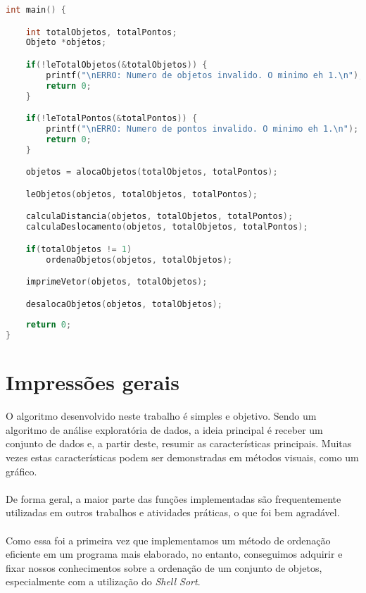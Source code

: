 \documentclass{article}
\begin{document}
\begin{lstlisting}[label={lst:cod1},language=C]
int main() {

    int totalObjetos, totalPontos;
    Objeto *objetos;

    if(!leTotalObjetos(&totalObjetos)) {
        printf("\nERRO: Numero de objetos invalido. O minimo eh 1.\n");
        return 0;
    }

    if(!leTotalPontos(&totalPontos)) {
        printf("\nERRO: Numero de pontos invalido. O minimo eh 1.\n");
        return 0;
    }

    objetos = alocaObjetos(totalObjetos, totalPontos);

    leObjetos(objetos, totalObjetos, totalPontos);

    calculaDistancia(objetos, totalObjetos, totalPontos);
    calculaDeslocamento(objetos, totalObjetos, totalPontos);

    if(totalObjetos != 1)
        ordenaObjetos(objetos, totalObjetos);

    imprimeVetor(objetos, totalObjetos);

    desalocaObjetos(objetos, totalObjetos);
    
    return 0;
}
\end{lstlisting}

\clearpage


\section{Impressões gerais}

\hspace*{\parindent}O algoritmo desenvolvido neste trabalho é simples e objetivo. Sendo um algoritmo de análise exploratória de dados, a ideia principal é receber um conjunto de dados e, a partir deste, resumir as características principais. Muitas vezes estas características podem ser demonstradas em métodos visuais, como um gráfico.\\\\
\hspace*{\parindent}De forma geral, a maior parte das funções implementadas são frequentemente utilizadas em outros trabalhos e atividades práticas, o que foi bem agradável.\\\\
\hspace*{\parindent}Como essa foi a primeira vez que implementamos um método de ordenação eficiente em um programa mais elaborado, no entanto, conseguimos adquirir e fixar nossos conhecimentos sobre a ordenação de um conjunto de objetos, especialmente com a utilização do \textit{Shell Sort}.
\end{document}
